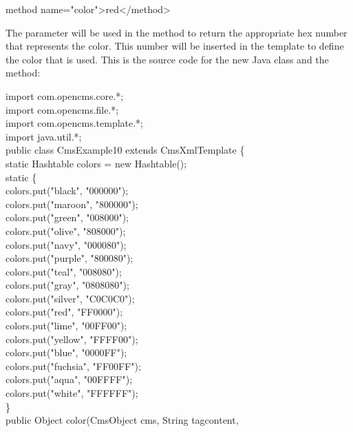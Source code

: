 {\meth method name="color">red</method>}

The parameter will be used in the method to return the appropriate hex
number that represents the color. This number will be inserted in the
template to define the color that is used. This is the source code for
the new Java class and the method:

\begin{java}
import com.opencms.core.*;\\
import com.opencms.file.*;\\
import com.opencms.template.*;\\
import java.util.*;\\

public class CmsExample10 extends CmsXmlTemplate \{\\
\jtabc        static Hashtable colors = new Hashtable();\\
\jtabc        static \{\\
\jtabd                colors.put("black", "000000");\\
\jtabd                colors.put("maroon", "800000");\\
\jtabd                colors.put("green", "008000");\\
\jtabd                colors.put("olive", "808000");\\
\jtabd                colors.put("navy", "000080");\\
\jtabd                colors.put("purple", "800080");\\
\jtabd                colors.put("teal", "008080");\\
\jtabd                colors.put("gray", "0808080");\\
\jtabd                colors.put("silver", "C0C0C0");\\
\jtabd                colors.put("red", "FF0000");\\
\jtabd                colors.put("lime", "00FF00");\\
\jtabd                colors.put("yellow", "FFFF00");\\
\jtabd                colors.put("blue", "0000FF");\\
\jtabd                colors.put("fuchsia", "FF00FF");\\
\jtabd                colors.put("aqua", "00FFFF");\\
\jtabd                colors.put("white", "FFFFFF");\\
\jtabc        \}\\
\jtabb    public Object color(CmsObject cms, String tagcontent,\\

\end{java}
